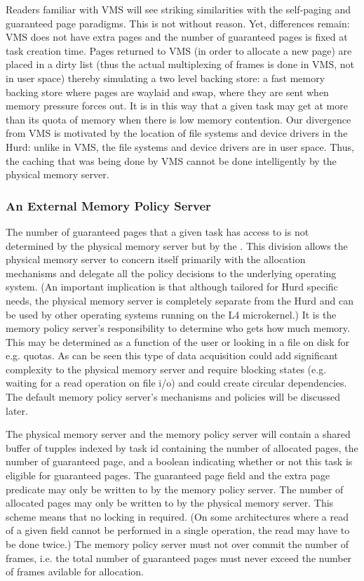 Readers familiar with VMS will see striking similarities with the
self-paging and guaranteed page paradigms.  This is not without
reason.  Yet, differences remain: VMS does not have extra pages and
the number of guaranteed pages is fixed at task creation time.  Pages
returned to VMS (in order to allocate a new page) are placed in a
dirty list (thus the actual multiplexing of frames is done in VMS, not
in user space) thereby simulating a two level backing store: a fast
memory backing store where pages are waylaid and swap, where they are
sent when memory pressure forces out.  It is in this way that a given
task may get at more than its quota of memory when there is low memory
contention.  Our divergence from VMS is motivated by the location of
file systems and device drivers in the Hurd: unlike in VMS, the file
systems and device drivers are in user space.  Thus, the caching that
was being done by VMS cannot be done intelligently by the physical
memory server.

\subsubsection{An External Memory Policy Server}

The number of guaranteed pages that a given task has access to is not
determined by the physical memory server but by the .  This division allows the physical memory server to
concern itself primarily with the allocation mechanisms and delegate
all the policy decisions to the underlying operating system.  (An
important implication is that although tailored for Hurd specific
needs, the physical memory server is completely separate from the Hurd
and can be used by other operating systems running on the L4
microkernel.)  It is the memory policy server's responsibility to
determine who gets how much memory.  This may be determined as a
function of the user or looking in a file on disk for e.g. quotas.  As
can be seen this type of data acquisition could add significant
complexity to the physical memory server and require blocking states
(e.g. waiting for a read operation on file i/o) and could create
circular dependencies.  The default memory policy server's mechanisms
and policies will be discussed later.

The physical memory server and the memory policy server will contain a
shared buffer of tupples indexed by task id containing the number of
allocated pages, the number of guaranteed page, and a boolean
indicating whether or not this task is eligible for guaranteed pages.
The guaranteed page field and the extra page predicate may only be
written to by the memory policy server.  The number of allocated pages
may only be written to by the physical memory server.  This scheme
means that no locking in required.  (On some architectures where a
read of a given field cannot be performed in a single operation, the
read may have to be done twice.)  The memory policy server must not
over commit the number of frames, i.e. the total number of guaranteed
pages must never exceed the number of frames avilable for allocation.

